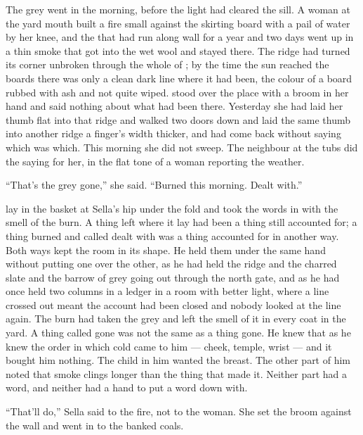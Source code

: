 
The grey went in the morning, before the light had cleared the sill. A woman at the yard mouth built a fire small against the skirting board with a pail of water by her knee, and the  that had run along  wall for a year and two days went up in a thin smoke that got into the wet wool and stayed there. The ridge had turned its corner unbroken through the whole of ; by the time the sun reached the boards there was only a clean dark line where it had been, the colour of a board rubbed with ash and not quite wiped.  stood over the place with a broom in her hand and said nothing about what had been there. Yesterday she had laid her thumb flat into that ridge and walked two doors down  and laid the same thumb into another ridge a finger's width thicker, and had come back without saying which was which. This morning she did not sweep. The neighbour at the tubs did the saying for her, in the flat tone of a woman reporting the weather.

“That's the grey gone,” she said. “Burned this morning. Dealt with.”

 lay in the basket at Sella's hip under the fold and took the words in with the smell of the burn. A thing left where it lay had been a thing still accounted for; a thing burned and called dealt with was a thing accounted for in another way. Both ways kept the room in its shape. He held them under the same hand without putting one over the other, as he had held the ridge and the charred slate and the barrow of grey going out through the north gate, and as he had once held two columns in a ledger in a room with better light, where a line crossed out meant the account had been closed and nobody looked at the line again. The burn had taken the grey and left the smell of it in every coat in the yard. A thing called gone was not the same as a thing gone. He knew that as he knew the order in which cold came to him --- cheek, temple, wrist --- and it bought him nothing. The child in him wanted the breast. The other part of him noted that smoke clings longer than the thing that made it. Neither part had a word, and neither had a hand to put a word down with.

“That'll do,” Sella said to the fire, not to the woman. She set the broom against the wall and went in to the banked coals.

\scenebreak

